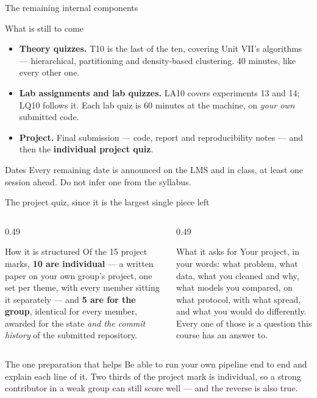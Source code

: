\documentclass[aspectratio=169]{beamer}
\begin{document}
\begin{frame}[shrink=8]{The remaining internal components}
  \begin{block}{What is still to come}
    \begin{itemize}
      \item \textbf{Theory quizzes.} T10 is the last of the ten, covering
        Unit VII's algorithms --- hierarchical, partitioning and
        density-based clustering. 40 minutes, like every other one.
      \item \textbf{Lab assignments and lab quizzes.} LA10 covers experiments
        13 and 14; LQ10 follows it. Each lab quiz is 60 minutes at the
        machine, on \emph{your own} submitted code.
      \item \textbf{Project.} Final submission --- code, report and
        reproducibility notes --- and then the \textbf{individual project
        quiz}.
    \end{itemize}
  \end{block}
  \begin{alertblock}{Dates}
    Every remaining date is announced on the LMS and in class, at least one
    session ahead. Do not infer one from the syllabus.
  \end{alertblock}
\end{frame}

\begin{frame}[shrink=8]{The project quiz, since it is the largest single piece left}
  \begin{columns}[T]
    \begin{column}{0.49\textwidth}
      \begin{block}{How it is structured}
        Of the 15 project marks, \textbf{10 are individual} --- a written
        paper on your own group's project, one set per theme, with every
        member sitting it separately --- and \textbf{5 are for the group},
        identical for every member, awarded for the state \emph{and the
        commit history} of the submitted repository.
      \end{block}
    \end{column}
    \begin{column}{0.49\textwidth}
      \begin{block}{What it asks for}
        Your project, in your words: what problem, what data, what you
        cleaned and why, what models you compared, on what protocol, with
        what spread, and what you would do differently. Every one of those is
        a question this course has an answer to.
      \end{block}
    \end{column}
  \end{columns}
  \begin{alertblock}{The one preparation that helps}
    Be able to run your own pipeline end to end and explain each line of it.
    Two thirds of the project mark is individual, so a strong contributor in
    a weak group can still score well --- and the reverse is also true.
  \end{alertblock}
\end{frame}
\end{document}
